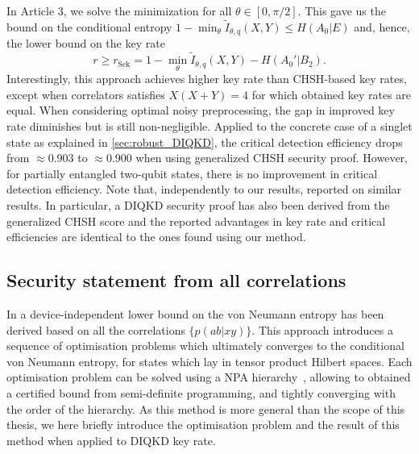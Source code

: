 In Article 3, we solve the minimization for all $\theta\in[0,\pi/2]$. This gave us the bound on the conditional entropy $1-\min_{\theta}\tilde{I}_{\theta,q}(X,Y)\leq H(A_0|E)$ and, hence, the lower bound on the key rate
\begin{equation}
	r \geq r_\mathrm{Sek} = 1 - \min_{\theta} \tilde{I}_{\theta,q}(X,Y) - H(A_0'|B_2).
	\label{eq:Sekatstki}
\end{equation}
Interestingly, this approach achieves higher key rate than CHSH-based key rates, except when correlators satisfies $X(X+Y)=4$ for which obtained key rates are equal.
When considering optimal noisy preprocessing, the gap in improved key rate diminishes but is still non-negligible.
Applied to the concrete case of a singlet state as explained in \ref{sec:robust_DIQKD}, the critical detection efficiency drops from $\approx 0.903$ to $\approx 0.900$ when using generalized CHSH security proof.
However, for partially entangled two-qubit states, there is no improvement in critical detection efficiency.
Note that, independently to our results, \cite{Woodhead2021} reported on similar results. In particular, a DIQKD security proof has also been derived from the generalized CHSH score and the reported advantages in key rate and critical efficiencies are identical to the ones found using our method.

\medbreak


\subsection{Security statement from all correlations}
\label{sec:Brown}

In \cite{Brown2021} a device-independent lower bound on the von Neumann entropy has been derived based on all the correlations $\{p(ab|xy)\}$.
This approach introduces a sequence of optimisation problems which ultimately converges to the conditional von Neumann entropy, for states which lay in tensor product Hilbert spaces.
Each optimisation problem can be solved using a NPA hierarchy~\cite{Navascues2007,Pironio2010}, allowing to obtained a certified bound from semi-definite programming, and tightly converging with the order of the hierarchy.
As this method is more general than the scope of this thesis, we here briefly introduce the optimisation problem and the result of this method when applied to DIQKD key rate.

\medbreak

